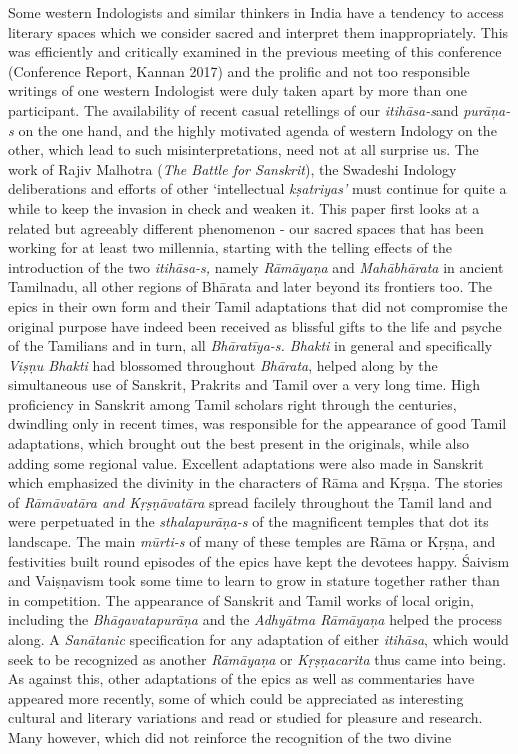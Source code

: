 Some western Indologists and similar thinkers in India have a tendency to access literary spaces which we consider sacred and interpret them inappropriately. This was efficiently and critically examined in the previous meeting of this conference (Conference Report, Kannan 2017) and the prolific and not too responsible writings of one western Indologist were duly taken apart by more than one participant. The availability of recent casual retellings of our \textit{itihāsa-s}\break and \textit{purāņa-s} on the one hand, and the highly motivated agenda of western Indology on the other, which lead to such misinterpretations, need not at all surprise us. The work of Rajiv Malhotra (\textit{The Battle for Sanskrit}), the Swadeshi Indology deliberations and efforts of other ‘intellectual \textit{kṣatriyas’} must continue for quite a while to keep the invasion in check and weaken it. This paper first looks at a related but agreeably different phenomenon - our sacred spaces that has been working for at least two millennia, starting with the telling effects of the introduction of the two \textit{itihāsa-s,} namely \textit{Rāmāyaṇa} and \textit{Mahābhārata} in ancient Tamilnadu, all other regions of Bhārata and later beyond its frontiers too. The epics in their own form and their Tamil adaptations that did not compromise the original purpose have indeed been received as blissful gifts to the life and psyche of the Tamilians and in turn, all \textit{Bhāratīya-s. Bhakti} in general and specifically \textit{Viṣṇu Bhakti} had blossomed throughout \textit{Bhārata}, helped along by the simultaneous use of Sanskrit, Prakrits and Tamil over a very long time. High proficiency in Sanskrit among Tamil scholars right through the centuries, dwindling only in recent times, was responsible for the appearance of good Tamil adaptations, which brought out the best present in the originals, while also adding some regional value. Excellent adaptations were also made in Sanskrit which emphasized the divinity in the characters of Rāma and Kṛṣṇa. The stories of \textit{Rāmāvatāra and Kṛṣṇāvatāra} spread facilely throughout the Tamil land and were perpetuated in the \textit{sthalapurāṇa-s} of the magnificent temples that dot its landscape. The main \textit{mūrti-s} of many of these temples are Rāma or Kṛṣṇa, and festivities built round episodes of the epics have kept the devotees happy. Śaivism and Vaiṣṇavism took some time to learn to grow in stature together rather than in competition. The appearance of Sanskrit and Tamil works of local origin, including the \textit{Bhāgavatapurāṇa} and the \textit{Adhyātma Rāmāyaņa} helped the process along. A \textit{Sanātanic} specification for any adaptation of either \textit{itihāsa}, which would seek to be recognized as another \textit{Rāmāyaṇa} or \textit{Kṛṣṇacarita} thus came into being. As against this, other adaptations of the epics as well as commentaries have appeared more recently, some of which could be appreciated as interesting cultural and literary variations and read or studied for pleasure and research. Many however, which did not reinforce the recognition of the two divine 